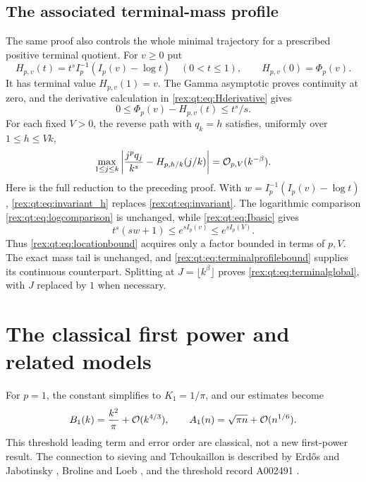 \subsection{The associated terminal-mass profile}
The same proof also controls the whole minimal trajectory for a prescribed positive terminal quotient. For $v\ge0$ put
\begin{equation}\label{rex:qt:eq:terminalprofile}
 H_{p,v}(t)=t^s I_p^{-1}(I_p(v)-\log t)\quad(0<t\le1),
 \qquad H_{p,v}(0)=\Phi_p(v).
\end{equation}
It has terminal value $H_{p,v}(1)=v$. The Gamma asymptotic proves continuity at zero, and the derivative calculation in \eqref{rex:qt:eq:Hderivative} gives
\begin{equation}\label{rex:qt:eq:terminalprofilebound}
 0\le\Phi_p(v)-H_{p,v}(t)\le t^s/s.
\end{equation}
For each fixed $V>0$, the reverse path with $q_k=h$ satisfies, uniformly over $1\le h\le Vk$,
\begin{equation}\label{rex:qt:eq:terminalglobal}
 \max_{1\le j\le k}\left|\frac{j^p q_j}{k^s}-H_{p,h/k}(j/k)\right|
                  =\mathcal O_{p,V}(k^{-\beta}).
\end{equation}
Here is the full reduction to the preceding proof. With $w=I_p^{-1}(I_p(v)-\log t)$, \eqref{rex:qt:eq:invariant_h} replaces \eqref{rex:qt:eq:invariant}. The logarithmic comparison \eqref{rex:qt:eq:logcomparison} is unchanged, while \eqref{rex:qt:eq:Ibasic} gives
\[
 t^s(sw+1)\le e^{sI_p(v)}\le e^{sI_p(V)}.
\]
Thus \eqref{rex:qt:eq:locationbound} acquires only a factor bounded in terms of $p,V$. The exact mass tail is unchanged, and \eqref{rex:qt:eq:terminalprofilebound} supplies its continuous counterpart. Splitting at $J=\lfloor k^\beta\rfloor$ proves \eqref{rex:qt:eq:terminalglobal}, with $J$ replaced by $1$ when necessary.

\section{The classical first power and related models}\label{rex:qt:sec:history}
For $p=1$, the constant simplifies to $K_1=1/\pi$, and our estimates become
\begin{equation}\label{rex:qt:eq:p1}
 B_1(k)=\frac{k^2}{\pi}+\mathcal O(k^{4/3}),\qquad
 A_1(n)=\sqrt{\pi n}+\mathcal O(n^{1/6}).
\end{equation}
This threshold leading term and error order are classical, not a new first-power result. The connection to sieving and Tchoukaillon is described by Erd\H{o}s and Jabotinsky \cite{erdos-jabotinsky}, Broline and Loeb \cite{broline-loeb}, and the threshold record A002491 \cite{oeis-threshold}.

